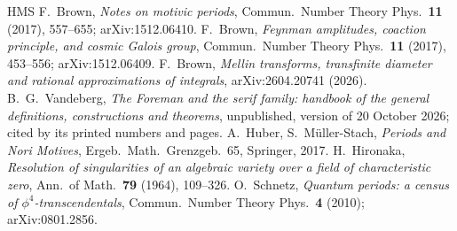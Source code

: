\documentclass[11pt]{article}
\theoremstyle{plain}
\theoremstyle{definition}
\theoremstyle{remark}
\begin{document}
\begin{thebibliography}{HMS}
 F.~Brown, \emph{Notes on motivic periods}, Commun.\ Number Theory Phys.\ \textbf{11} (2017), 557--655; arXiv:1512.06410.
 F.~Brown, \emph{Feynman amplitudes, coaction principle, and cosmic Galois group}, Commun.\ Number Theory Phys.\ \textbf{11} (2017), 453--556; arXiv:1512.06409.
 F.~Brown, \emph{Mellin transforms, transfinite diameter and rational approximations of integrals}, arXiv:2604.20741 (2026).
 B.~G.~Vandeberg, \emph{The Foreman and the serif family: handbook of the general definitions, constructions and theorems}, unpublished, version of 20 October 2026; cited by its printed numbers and pages.
 A.~Huber, S.~M\"uller-Stach, \emph{Periods and Nori Motives}, Ergeb.\ Math.\ Grenzgeb.\ 65, Springer, 2017.
 H.~Hironaka, \emph{Resolution of singularities of an algebraic variety over a field of characteristic zero}, Ann.\ of Math.\ \textbf{79} (1964), 109--326.
 O.~Schnetz, \emph{Quantum periods: a census of $\phi^4$-transcendentals}, Commun.\ Number Theory Phys.\ \textbf{4} (2010); arXiv:0801.2856.
\end{thebibliography}
\end{document}
